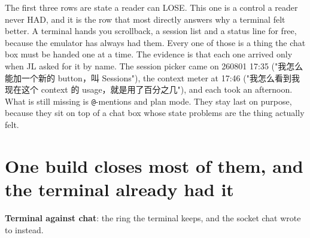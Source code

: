 The first three rows are state a reader can LOSE. This one is a control a reader never HAD, and it is the row that most directly answers why a terminal felt better. A terminal hands you scrollback, a session list and a status line for free, because the emulator has always had them. Every one of those is a thing the chat box must be handed one at a time. The evidence is that each one arrived only when JL asked for it by name. The session picker came on 260801 17:35 ("我怎么能加一个新的 button，叫 Sessions"), the context meter at 17:46 ("我怎么看到我现在这个 context 的 usage，就是用了百分之几"), and each took an afternoon. What is still missing is \texttt{@}-mentions and plan mode. They stay last on purpose, because they sit on top of a chat box whose state problems are the thing actually felt.


\section{One build closes most of them, and the terminal already had it}
\textbf{Terminal against chat}: the ring the terminal keeps, and the socket chat wrote to instead.

